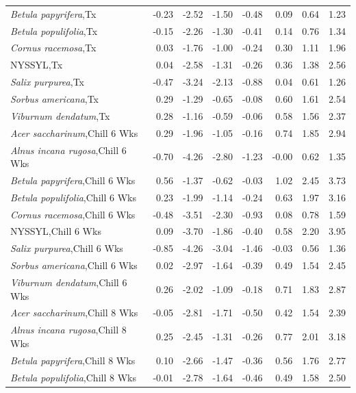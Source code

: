 \documentclass{article}\usepackage[]{graphicx}\usepackage[]{color}
\begin{document}
\begin{longtable}{lrrrrrrr}
  \textit{Betula papyrifera},Tx & -0.23 & -2.52 & -1.50 & -0.48 & 0.09 & 0.64 & 1.23 \\ 
  \textit{Betula populifolia},Tx & -0.15 & -2.26 & -1.30 & -0.41 & 0.14 & 0.76 & 1.34 \\ 
  \textit{Cornus racemosa},Tx & 0.03 & -1.76 & -1.00 & -0.24 & 0.30 & 1.11 & 1.96 \\ 
  NYSSYL,Tx & 0.04 & -2.58 & -1.31 & -0.26 & 0.36 & 1.38 & 2.56 \\ 
  \textit{Salix purpurea},Tx & -0.47 & -3.24 & -2.13 & -0.88 & 0.04 & 0.61 & 1.26 \\ 
  \textit{Sorbus americana},Tx & 0.29 & -1.29 & -0.65 & -0.08 & 0.60 & 1.61 & 2.54 \\ 
  \textit{Viburnum dendatum},Tx & 0.28 & -1.16 & -0.59 & -0.06 & 0.58 & 1.56 & 2.37 \\ 
  \textit{Acer saccharinum},Chill 6 Wks & 0.29 & -1.96 & -1.05 & -0.16 & 0.74 & 1.85 & 2.94 \\ 
  \textit{Alnus incana rugosa},Chill 6 Wks & -0.70 & -4.26 & -2.80 & -1.23 & -0.00 & 0.62 & 1.35 \\ 
  \textit{Betula papyrifera},Chill 6 Wks & 0.56 & -1.37 & -0.62 & -0.03 & 1.02 & 2.45 & 3.73 \\ 
  \textit{Betula populifolia},Chill 6 Wks & 0.23 & -1.99 & -1.14 & -0.24 & 0.63 & 1.97 & 3.16 \\ 
  \textit{Cornus racemosa},Chill 6 Wks & -0.48 & -3.51 & -2.30 & -0.93 & 0.08 & 0.78 & 1.59 \\ 
  NYSSYL,Chill 6 Wks & 0.09 & -3.70 & -1.86 & -0.40 & 0.58 & 2.20 & 3.95 \\ 
  \textit{Salix purpurea},Chill 6 Wks & -0.85 & -4.26 & -3.04 & -1.46 & -0.03 & 0.56 & 1.36 \\ 
  \textit{Sorbus americana},Chill 6 Wks & 0.02 & -2.97 & -1.64 & -0.39 & 0.49 & 1.54 & 2.45 \\ 
  \textit{Viburnum dendatum},Chill 6 Wks & 0.26 & -2.02 & -1.09 & -0.18 & 0.71 & 1.83 & 2.87 \\ 
  \textit{Acer saccharinum},Chill 8 Wks & -0.05 & -2.81 & -1.71 & -0.50 & 0.42 & 1.54 & 2.39 \\ 
  \textit{Alnus incana rugosa},Chill 8 Wks & 0.25 & -2.45 & -1.31 & -0.26 & 0.77 & 2.01 & 3.18 \\ 
  \textit{Betula papyrifera},Chill 8 Wks & 0.10 & -2.66 & -1.47 & -0.36 & 0.56 & 1.76 & 2.77 \\ 
  \textit{Betula populifolia},Chill 8 Wks & -0.01 & -2.78 & -1.64 & -0.46 & 0.49 & 1.58 & 2.50 \\ 

\end{longtable}
\end{document}
